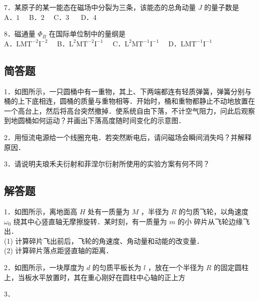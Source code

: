 7．某原子的某一能态在磁场中分裂为三条，该能态的总角动量 $J$ 的量子数是\\
A．$1\quad $ B．$2 \quad$ C．3 $\quad$ D．4

8．磁通量 $\Phi_B$ 在国际单位制中的量纲是\\
A．$\mathrm{LMT^{-2}I^{-2}}\quad$ B．$\mathrm{L^{2}MT^{-2}I^{-1}}\quad$ C．$\mathrm{L^{2}MT^{-1}I^{-1}}\quad$ D．$\mathrm{LMT^{-1}I^{-1}}$

\subsection{简答题}
1．如图所示，一只圆桶中有一重物，其上、下两端都连有轻质弹簧，弹簧分别与桶的上下底相连，圆桶的质量与重物相等．开始时，桶和重物都静止不动地放置在一个高台上，然后将高台突然撤掉．使系统自由下落，不计空气阻力，问此后观察到地圆桶如何运动？并画出下落高度随时间变化的示意图．


2．用恒流电源给一个线圈充电．若突然断电后，请问磁场会瞬间消失吗？并解释原因．


3．请说明夫琅禾夫衍射和菲涅尔衍射所使用的实验方案有何不同？


\subsection{解答题}
1．如图所示，离地面高 $H$ 处有一质量为 $M$ ，半径为 $R$ 的匀质飞轮，以角速度 $\omega_0$ 绕其中心竖直轴无摩擦旋转．某时刻，有一质量为 $m$ 的小 碎片从飞轮边缘飞出．\\
(1) 计算碎片飞出前后，飞轮的角速度、角动量和动能的改变量．\\
(2) 计算碎片落点距竖直轴的距离．

2．如图所示，一块厚度为 $d$ 的匀质平板长为 $l$ ，放在一个半径为 $R$ 的固定圆柱上，当板水平放置时，其在重心刚好在圆柱中心轴的正上方


3．

